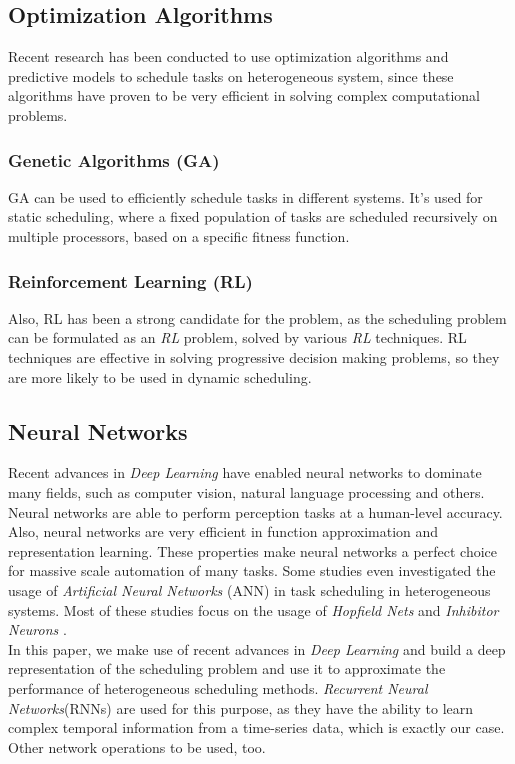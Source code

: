 \documentclass[twocolumn,11pt]{IEEEtran}
\begin{document}
\subsection{Optimization Algorithms}
Recent research has been conducted to use optimization algorithms and predictive models to schedule tasks on heterogeneous system, since these algorithms have proven to be very efficient in solving complex computational problems. 
\subsubsection{Genetic Algorithms (GA)}
GA \cite{article2} can be used to efficiently schedule tasks in different systems. It's used for static scheduling, where a fixed population of tasks are scheduled recursively on multiple processors, based on a specific fitness function.
\subsubsection{Reinforcement Learning (RL)}
Also, RL \cite{ORHEAN2018292} has been a strong candidate for the problem, as the scheduling problem can be formulated as an \emph{RL} problem, solved by various \emph{RL} techniques. RL techniques are effective in solving progressive decision making problems, so they are more likely to be used in dynamic scheduling.

\subsection{Neural Networks}
Recent advances in \emph{Deep Learning} have enabled neural networks to dominate many fields, such as computer vision, natural language processing and others. Neural networks are able to perform perception tasks at a human-level accuracy. Also, neural networks are very efficient in function approximation and representation learning. These properties make neural networks a perfect choice for massive scale automation of many tasks. Some studies even investigated the usage of \emph{Artificial Neural Networks} (ANN)\cite{article3} in task scheduling in heterogeneous systems. Most of these studies focus on the usage of \emph{Hopfield Nets} and \emph{Inhibitor Neurons} \cite{article3}. \\

In this paper, we make use of recent advances in \emph{Deep Learning} and build a deep representation of the scheduling problem and use it to approximate the performance of heterogeneous scheduling methods. \emph{Recurrent Neural Networks}(RNNs) \cite{chung2014empirical} are used for this purpose, as they have the ability to learn complex temporal information from a time-series data, which is exactly our case. Other network operations to be used, too.
\end{document}
